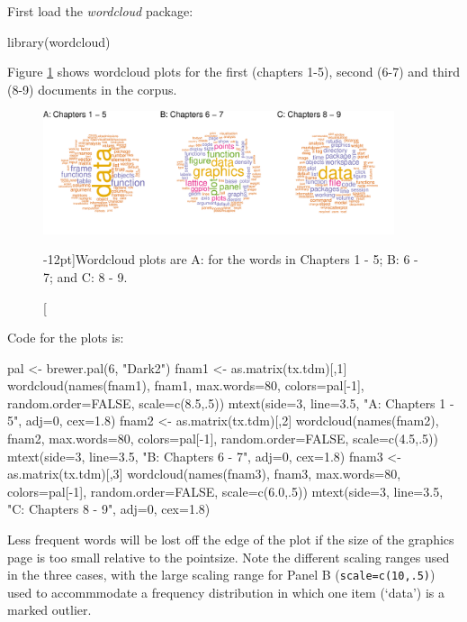 \documentclass{tufte-book}\usepackage[]{graphicx}\usepackage[]{color}
\newcommand{\txtt}[1]{\texttt{#1}}
\begin{document}
First load the {\em wordcloud} package:
\begin{Schunk}
\begin{Sinput}
library(wordcloud)
\end{Sinput}
\end{Schunk}

Figure \ref{fig:wc} shows wordcloud plots for the first (chapters 1-5),
second (6-7) and third (8-9) documents in the corpus.
\vspace*{15pt}

\begin{figure}
\begin{Schunk}


\centerline{\includegraphics[width=0.92\textwidth]{figs/11-wordcloud1-3-1} }

\end{Schunk}
\caption[][-12pt]{Wordcloud plots are A: for the words in Chapters 1 - 5; B: 6 -
  7; and C: 8 - 9.\label{fig:wc}}
\end{figure}

\vspace*{-9pt}

\noindent
Code for the plots is:
\begin{fullwidth}
\begin{Schunk}
\begin{Sinput}
pal <- brewer.pal(6, "Dark2")
fnam1 <- as.matrix(tx.tdm)[,1]
wordcloud(names(fnam1), fnam1, max.words=80, colors=pal[-1],
          random.order=FALSE, scale=c(8.5,.5))
mtext(side=3, line=3.5, "A: Chapters 1 - 5", adj=0, cex=1.8)
fnam2 <- as.matrix(tx.tdm)[,2]
wordcloud(names(fnam2), fnam2, max.words=80, colors=pal[-1],
          random.order=FALSE, scale=c(4.5,.5))
mtext(side=3, line=3.5, "B: Chapters 6 - 7", adj=0, cex=1.8)
fnam3 <- as.matrix(tx.tdm)[,3]
wordcloud(names(fnam3), fnam3, max.words=80, colors=pal[-1],
          random.order=FALSE, scale=c(6.0,.5))
mtext(side=3, line=3.5, "C: Chapters 8 - 9", adj=0, cex=1.8)
\end{Sinput}
\end{Schunk}
\end{fullwidth}
 Less frequent words will be lost off the
edge of the plot if the size of the graphics page is too small
relative to the pointsize.  Note the different scaling ranges used in
the three cases, with the large scaling range for Panel B
(\txtt{scale=c(10,.5)}) used to accommmodate a frequency distribution
in which one item (`data') is a marked outlier.
\end{document}
